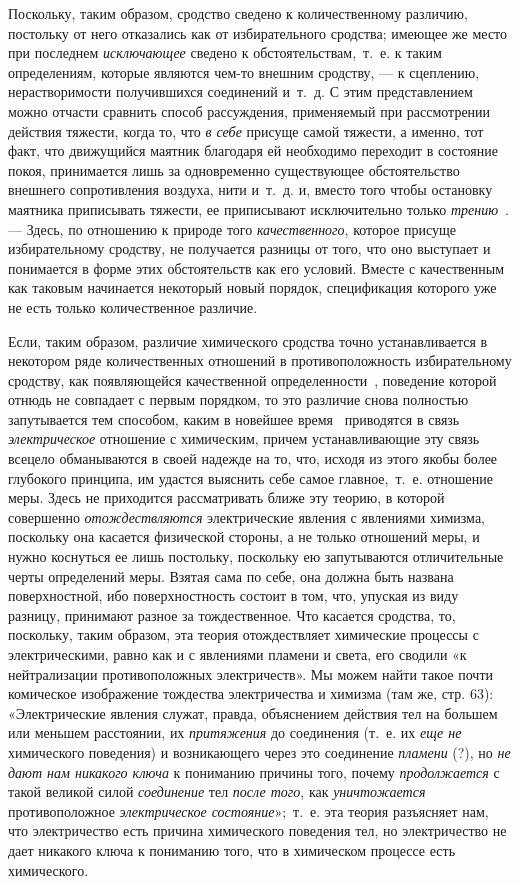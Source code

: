 Поскольку, таким образом, сродство сведено к количественному различию,
постольку от него отказались как от избирательного сродства; имеющее же
место при последнем {\em исключающее} сведено к
обстоятельствам,~т.~е. к таким определениям, которые являются чем-то
внешним сродству, — к сцеплению, нерастворимости получившихся соединений
и~т.~д. С этим представлением можно отчасти сравнить способ рассуждения,
применяемый при рассмотрении действия тяжести, когда то, что
{\em в себе} присуще самой тяжести, а именно, тот факт,
что движущийся маятник благодаря ей необходимо переходит в состояние покоя,
принимается лишь за одновременно существующее обстоятельство внешнего
сопротивления воздуха, нити и~т.~д. и, вместо того чтобы остановку маятника
приписывать тяжести, ее приписывают исключительно только
{\em трению}~\label{bkm:Ref474666715}.
— Здесь, по отношению к природе того
{\em качественного}, которое присуще избирательному
сродству, не получается разницы от того, что оно выступает и понимается в
форме этих обстоятельств как его условий. Вместе с качественным как таковым
начинается некоторый новый порядок, спецификация которого уже не есть
только количественное различие.

Если, таким образом, различие химического сродства точно устанавливается в
некотором ряде количественных отношений в противоположность избирательному
сродству, как появляющейся качественной
определенности~\label{bkm:Ref474666719},
поведение которой отнюдь не совпадает с первым порядком, то это различие
снова полностью запутывается тем способом, каким в новейшее
время~\label{bkm:Ref474666725}
приводятся в связь {\em электрическое} отношение с
химическим, причем устанавливающие эту связь всецело обманываются в своей
надежде на то, что, исходя из этого якобы более глубокого принципа, им
удастся выяснить себе самое главное,~т.~е. отношение меры. Здесь не
приходится рассматривать ближе эту теорию, в которой совершенно
{\em отождествляются} электрические явления с явлениями
химизма, поскольку она касается физической стороны, а не только отношений
меры, и нужно коснуться ее лишь постольку, поскольку ею запутываются
отличительные черты определений меры. Взятая сама по себе, она должна быть
названа поверхностной, ибо поверхностность состоит в том, что, упуская из
виду разницу, принимают разное за тождественное. Что касается сродства, то,
поскольку, таким образом, эта теория отождествляет химические процессы с
электрическими, равно как и с явлениями пламени и света, его сводили «к
нейтрализации противоположных электричеств». Мы можем найти такое почти
комическое изображение тождества электричества и химизма (там же, стр. 63):
«Электрические явления служат, правда, объяснением действия тел на большем
или меньшем расстоянии, их {\em притяжения} до
соединения (т.~е. их {\em еще не} химического
поведения) и возникающего через это соединение
{\em пламени} (?), но {\em не дают
нам никакого ключа} к пониманию причины того, почему
{\em продолжается} с такой великой силой
{\em соединение} тел {\em после
того}, как {\em уничтожается} противоположное
{\em электрическое состояние}»;~т.~е. эта теория
разъясняет нам, что электричество есть причина химического поведения тел,
но электричество не дает никакого ключа к пониманию того, что в химическом
процессе есть химического.

